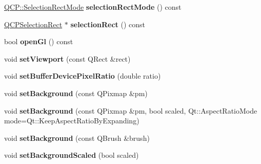 \begin{DoxyCompactItemize}
\item 
\hyperlink{namespace_q_c_p_ac9aa4d6d81ac76b094f9af9ad2d3aacf}{Q\+C\+P\+::\+Selection\+Rect\+Mode} {\bfseries selection\+Rect\+Mode} () const \hypertarget{class_q_custom_plot_afae2023152cd30e7052b536148226a04}{}\label{class_q_custom_plot_afae2023152cd30e7052b536148226a04}

\item 
\hyperlink{class_q_c_p_selection_rect}{Q\+C\+P\+Selection\+Rect} $\ast$ {\bfseries selection\+Rect} () const \hypertarget{class_q_custom_plot_a44f033e6615fab0193222d0a1ef517e2}{}\label{class_q_custom_plot_a44f033e6615fab0193222d0a1ef517e2}

\item 
bool {\bfseries open\+Gl} () const \hypertarget{class_q_custom_plot_ab81fd5b380574c6dee92b6d8c8fd1b18}{}\label{class_q_custom_plot_ab81fd5b380574c6dee92b6d8c8fd1b18}

\item 
void {\bfseries set\+Viewport} (const Q\+Rect \&rect)\hypertarget{class_q_custom_plot_a3f9bc4b939dd8aaba9339fd09f273fc4}{}\label{class_q_custom_plot_a3f9bc4b939dd8aaba9339fd09f273fc4}

\item 
void {\bfseries set\+Buffer\+Device\+Pixel\+Ratio} (double ratio)\hypertarget{class_q_custom_plot_a159162653ad6f8b8bf21263ba5787215}{}\label{class_q_custom_plot_a159162653ad6f8b8bf21263ba5787215}

\item 
void {\bfseries set\+Background} (const Q\+Pixmap \&pm)\hypertarget{class_q_custom_plot_a130358592cfca353ff3cf5571b49fb00}{}\label{class_q_custom_plot_a130358592cfca353ff3cf5571b49fb00}

\item 
void {\bfseries set\+Background} (const Q\+Pixmap \&pm, bool scaled, Qt\+::\+Aspect\+Ratio\+Mode mode=Qt\+::\+Keep\+Aspect\+Ratio\+By\+Expanding)\hypertarget{class_q_custom_plot_a8513971d6aa24d8b0d6a68d45b542130}{}\label{class_q_custom_plot_a8513971d6aa24d8b0d6a68d45b542130}

\item 
void {\bfseries set\+Background} (const Q\+Brush \&brush)\hypertarget{class_q_custom_plot_a8ed256cf467bfa7ba1f9feaae62c3bd0}{}\label{class_q_custom_plot_a8ed256cf467bfa7ba1f9feaae62c3bd0}

\item 
void {\bfseries set\+Background\+Scaled} (bool scaled)\hypertarget{class_q_custom_plot_a36f0fa1317325dc7b7efea615ee2de1f}{}\label{class_q_custom_plot_a36f0fa1317325dc7b7efea615ee2de1f}


\end{DoxyCompactItemize}
